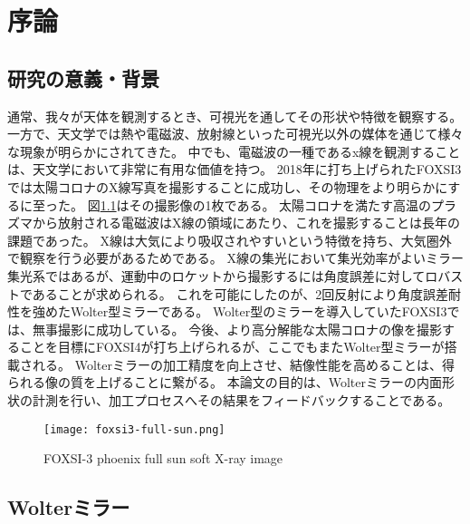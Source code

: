 \chapter{序論}
\thispagestyle{empty}
\label{chap1}
\graphicspath{{chap1/figure/}}
\minitoc



\newpage
\section{研究の意義・背景}
\label{chap1_background}

通常、我々が天体を観測するとき、可視光を通してその形状や特徴を観察する。
一方で、天文学では熱や電磁波、放射線といった可視光以外の媒体を通じて様々な現象が明らかにされてきた。
中でも、電磁波の一種であるx線を観測することは、天文学において非常に有用な価値を持つ。
2018年に打ち上げられたFOXSI3では太陽コロナのX線写真を撮影することに成功し、その物理をより明らかにするに至った。
図\ref{fig:foxsi-fullsun-image}はその撮影像の1枚である。
太陽コロナを満たす高温のプラズマから放射される電磁波はX線の領域にあたり、これを撮影することは長年の課題であった。
X線は大気により吸収されやすいという特徴を持ち、大気圏外で観察を行う必要があるためである。
X線の集光において集光効率がよいミラー集光系ではあるが、運動中のロケットから撮影するには角度誤差に対してロバストであることが求められる。
これを可能にしたのが、2回反射により角度誤差耐性を強めたWolter型ミラーである。
Wolter型のミラーを導入していたFOXSI3では、無事撮影に成功している。
今後、より高分解能な太陽コロナの像を撮影することを目標にFOXSI4が打ち上げられるが、ここでもまたWolter型ミラーが搭載される。
Wolterミラーの加工精度を向上させ、結像性能を高めることは、得られる像の質を上げることに繋がる。
本論文の目的は、Wolterミラーの内面形状の計測を行い、加工プロセスへその結果をフィードバックすることである。

\begin{figure}[h]
\centering
\texttt{[image: foxsi3-full-sun.png]}
\caption{FOXSI-3 phoenix full sun soft X-ray image}
\label{fig:foxsi-fullsun-image}
\end{figure}

\clearpage
\newpage

\section{Wolterミラー}
\label{chap1_wolter_mirror}

